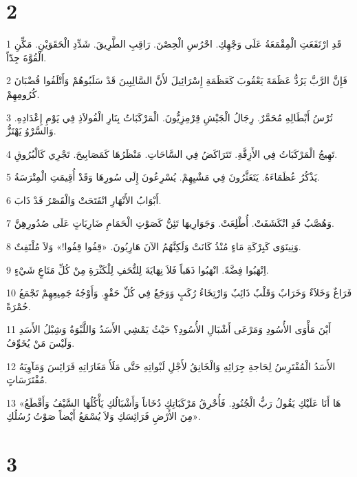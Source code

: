 \chapter{2}

\par 1 قَدِ ارْتَفَعَتِ الْمِقْمَعَةُ عَلَى وَجْهِكِ. احْرُسِ الْحِصْنَ. رَاقِبِ الطَّرِيقَ. شَدِّدِ الْحَقَوَيْنِ. مَكِّنِ الْقُوَّةَ جِدّاً.
\par 2 فَإِنَّ الرَّبَّ يَرُدُّ عَظَمَةَ يَعْقُوبَ كَعَظَمَةِ إِسْرَائِيلَ لأَنَّ السَّالِبِينَ قَدْ سَلَبُوهُمْ وَأَتْلَفُوا قُضْبَانَ كُرُومِهِمْ.
\par 3 تُرْسُ أَبْطَالِهِ مُحَمَّرٌ. رِجَالُ الْجَيْشِ قِرْمِزِيُّونَ. الْمَرْكَبَاتُ بِنَارِ الْفُولاَذِ فِي يَوْمِ إِعْدَادِهِ. وَالسَّرْوُ يَهْتَزُّ.
\par 4 تَهِيجُ الْمَرْكَبَاتُ فِي الأَزِقَّةِ. تَتَرَاكَضُ فِي السَّاحَاتِ. مَنْظَرُهَا كَمَصَابِيحَ. تَجْرِي كَالْبُرُوقِ.
\par 5 يَذْكُرُ عُظَمَاءَهُ. يَتَعَثَّرُونَ فِي مَشْيِهِمْ. يُسْرِعُونَ إِلَى سُورِهَا وَقَدْ أُقِيمَتِ الْمِتْرَسَةُ.
\par 6 أَبْوَابُ الأَنْهَارِ انْفَتَحَتْ وَالْقَصْرُ قَدْ ذَابَ.
\par 7 وَهُصَّبُ قَدِ انْكَشَفَتْ. أُطْلِعَتْ. وَجَوَارِيهَا تَئِنُّ كَصَوْتِ الْحَمَامِ ضَارِبَاتٍ عَلَى صُدُورِهِنَّ.
\par 8 وَنِينَوَى كَبِرْكَةِ مَاءٍ مُنْذُ كَانَتْ وَلَكِنَّهُمُ الآنَ هَارِبُونَ. «قِفُوا قِفُوا!» وَلاَ مُلْتَفِتٌ.
\par 9 اِنْهَبُوا فِضَّةً. انْهَبُوا ذَهَباً فَلاَ نِهَايَةَ لِلتُّحَفِ لِلْكَثْرَةِ مِنْ كُلِّ مَتَاعٍ شَيْءٍ.
\par 10 فَرَاغٌ وَخَلاَءٌ وَخَرَابٌ وَقَلْبٌ ذَائِبٌ وَارْتِخَاءُ رُكَبٍ وَوَجَعٌ فِي كُلِّ حَقْوٍ. وَأَوْجُهُ جَمِيعِهِمْ تَجْمَعُ حُمْرَةً.
\par 11 أَيْنَ مَأْوَى الأُسُودِ وَمَرْعَى أَشْبَالِ الأُسُودِ؟ حَيْثُ يَمْشِي الأَسَدُ وَاللَّبْوَةُ وَشِبْلُ الأَسَدِ وَلَيْسَ مَنْ يُخَوِّفُ.
\par 12 الأَسَدُ الْمُفْتَرِسُ لِحَاجةِ جِرَائِهِ وَالْخَانِقُ لأَجْلِ لَبْواتِهِ حَتَّى مَلَأَ مَغَارَاتِهِ فَرَائِسَ وَمَآوِيَهُ مُفْتَرَسَاتٍ.
\par 13 «هَا أَنَا عَلَيْكِ يَقُولُ رَبُّ الْجُنُودِ. فَأُحْرِقُ مَرْكَبَاتِكِ دُخَاناً وَأَشْبَالُكِ يَأْكُلُهَا السَّيْفُ وَأَقْطَعُ مِنَ الأَرْضِ فَرَائِسَكِ وَلاَ يُسْمَعُ أَيْضاً صَوْتُ رُسُلُكِ».

\chapter{3}

